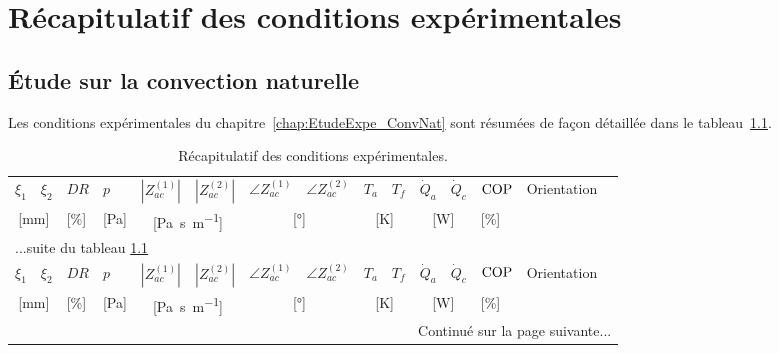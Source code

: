 \chapter{Récapitulatif des conditions expérimentales}
\section{\'Etude sur la convection naturelle}
Les conditions expérimentales du chapitre~\ref{chap:EtudeExpe_ConvNat} sont résumées de façon détaillée dans le tableau~\ref{tab:RecapCondExpe}.

\begin{longtable}{llll llll llll lll}
	\caption{Récapitulatif des conditions expérimentales.}
	\label{tab:RecapCondExpe}\\%
	
	\hline
	$\xi_1$ & $\xi_2$  & $DR$ & $p$ & $|Z_{ac}^{(1)}|$ & $|Z_{ac}^{(2)}|$& $\angle Z_{ac}^{(1)}$  & $\angle Z_{ac}^{(2)}$ & $T_a$  & $T_f$ & $\dot Q_a$ & $\dot Q_c$ & $\mathrm{COP}$ & \multirow{2}{*}{Orientation} \\%
	
	\multicolumn{2}{c}{[\unit{\milli\meter}]} & [\unit{\percent}] & [\unit{\pascal}] & \multicolumn{2}{c}{[\unit{\pascal\second\per\meter}]} & \multicolumn{2}{c}{[\unit{\degree}]}  & \multicolumn{2}{c}{[\unit{\kelvin}]} &\multicolumn{2}{c}{[\unit{\watt}]} & [\unit{\percent}] & \\\hline\hline \endfirsthead
	
	\multicolumn{15}{l}{...suite du tableau \ref{tab:RecapCondExpe}}\\\hline
	$\xi_1$ & $\xi_2$  & $DR$ & $p$ & $|Z_{ac}^{(1)}|$ & $|Z_{ac}^{(2)}|$& $\angle Z_{ac}^{(1)}$  & $\angle Z_{ac}^{(2)}$ & $T_a$  & $T_f$ & $\dot Q_a$ & $\dot Q_c$ & $\mathrm{COP}$ & \multirow{2}{*}{Orientation} \\%
	
	\multicolumn{2}{c}{[\unit{\milli\meter}]} & [\unit{\percent}] & [\unit{\pascal}] & \multicolumn{2}{c}{[\unit{\pascal\second\per\meter}]} & \multicolumn{2}{c}{[\unit{\degree}]}  & \multicolumn{2}{c}{[\unit{\kelvin}]} &\multicolumn{2}{c}{[\unit{\watt}]} & [\unit{\percent}] & \\\hline\hline \endhead
	
	\hline
	\multicolumn{15}{r}{Continué sur la page suivante...} \endfoot
    \hline \endlastfoot
	

\end{longtable}
